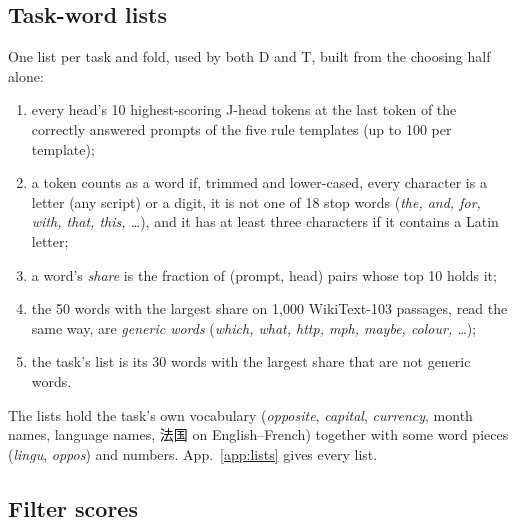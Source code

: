\documentclass[10pt,a4paper]{article}
\newcommand{\zh}[1]{{\cjkfont #1}}
\begin{document}
\subsection{Task-word lists}\label{sec:lists}

One list per task and fold, used by both D and T, built from the choosing half alone:
\begin{enumerate}
\item every head's 10 highest-scoring J-head tokens at the last token of the correctly answered prompts of the five rule templates (up to 100 per template);
\item a token counts as a word if, trimmed and lower-cased, every character is a letter (any script) or a digit, it is not one of 18 stop words (\emph{the, and, for, with, that, this, \dots}), and it has at least three characters if it contains a Latin letter;
\item a word's \emph{share} is the fraction of (prompt, head) pairs whose top 10 holds it;
\item the 50 words with the largest share on 1{,}000 WikiText-103 passages, read the same way, are \emph{generic words} (\emph{which, what, http, mph, maybe, colour, \dots});
\item the task's list is its 30 words with the largest share that are not generic words.
\end{enumerate}
The lists hold the task's own vocabulary (\emph{opposite}, \emph{capital}, \emph{currency}, month names, language names, \zh{法国} on English--French) together with some word pieces (\emph{lingu}, \emph{oppos}) and numbers. App.~\ref{app:lists} gives every list.

\subsection{Filter scores}\label{sec:filters}
\end{document}
